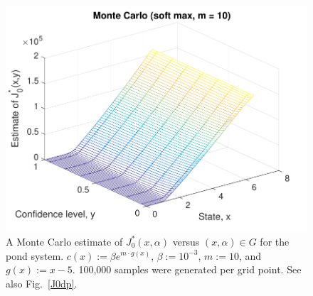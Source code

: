 \documentclass[letterpaper, 10 pt, conference]{ieeeconf}  %
\begin{document}
\begin{figure}[thpb]
      \centering
      \includegraphics[scale=0.5]{monte_carlo_sum_sept112018.pdf}
      \vspace{-1em}
      \caption{A Monte Carlo estimate of $J_0^*(x, \alpha)$ versus $(x, \alpha) \in G$ for the pond system.
	  $c(x) := \beta e^{m \cdot g(x)}$, $\beta := 10^{-3}$, $m := 10$, and $g(x) := x-5$.
	  100,000 samples were generated per grid point. See also Fig.~\ref{J0dp}.}
      \label{J0mc}
\end{figure}
\end{document}
